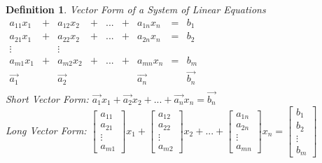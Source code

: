 \documentclass[a4paper,12pt]{book}
\theoremstyle{defn}
\newtheorem{defn}{Definition}[section]
\theoremstyle{expl}
\begin{document}
\begin{defn}
\textup{
Vector Form of a System of Linear Equations\\
$\begin{array}{ccccccccc}
a_{11}x_1&+&a_{12}x_2&+&...&+&a_{1n}x_n &=&b_1\\
a_{21}x_1&+&a_{22}x_2&+&...&+&a_{2n}x_n &=&b_2\\
\vdots&&\vdots\\
a_{m1}x_1&+&a_{m2}x_2&+&...&+&a_{mn}x_n&=& b_m\\
\vec{a_1}&&\vec{a_2}&&&&\vec{a_n}&&\vec{b_n}\\
\end{array}$\\
Short Vector Form: $\vec{a_1}x_1+\vec{a_2}x_2+...+\vec{a_n}x_n=\vec{b_n}$\\
Long Vector Form: $\left[\begin{array}{c} a_{11}\\a_{21}\\\vdots\\a_{m1}\end{array}\right]x_1
+\left[\begin{array}{c} a_{12}\\a_{22}\\\vdots\\a_{m2}\end{array}\right]x_2+...
+\left[\begin{array}{c} a_{1n}\\a_{2n}\\\vdots\\a_{mn}\end{array}\right]x_n
=\left[\begin{array}{c} b_{1}\\b_{2}\\\vdots\\b_{m}\end{array}\right]$
}\end{defn}
\end{document}

